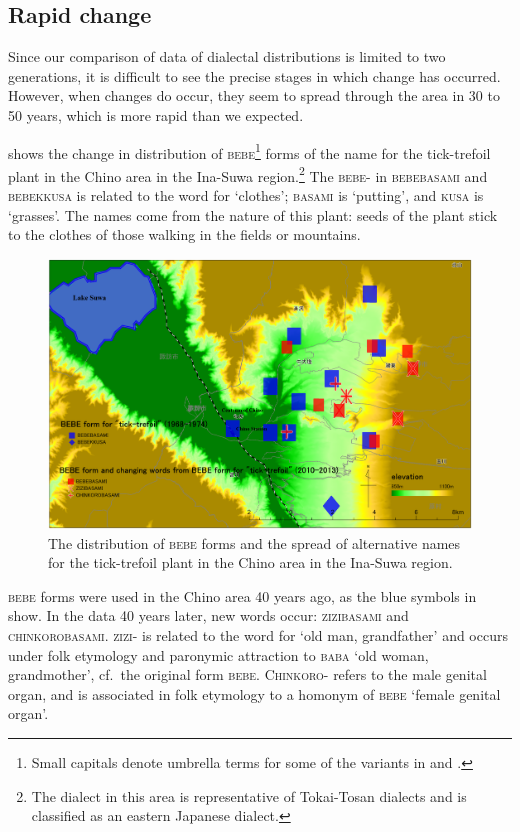 \documentclass[output=paper]{LSP/langsci}
\begin{document}
\subsection{Rapid change}
Since our comparison of  data of dialectal distributions is limited to two generations, it is difficult to see the precise stages in which change has occurred. However, when changes do occur, they seem to spread through the area in 30 to 50 years, which is more rapid than we expected.

 shows the change in distribution of \textsc{bebe}\footnote{ Small capitals denote umbrella terms for some of the variants in  and .} forms of the name for the tick-trefoil plant in the Chino area in the Ina-Suwa region.\footnote{ The dialect in this area is representative of Tokai-Tosan dialects and is classified as an eastern Japanese dialect.} The \textsc{bebe-} in \textsc{bebebasami} and \textsc{bebekkusa} is related to the word for `clothes'; \textsc{basami} is `putting', and \textsc{kusa} is `grasses'. The names come from the nature of this plant: seeds of the plant stick to the clothes of those walking in the fields or mountains.

\begin{figure}
\includegraphics[height=.4\textheight]{illustrations/onishi_fig5}
\caption{The distribution of \textsc{bebe} forms and the spread of alternative names for the tick-trefoil plant in the Chino area in the Ina-Suwa region.}
\label{fig:onishi:5}
\end{figure}


\largerpage
\textsc{bebe} forms were used in the Chino area 40 years ago, as the blue symbols in  show. In the data 40 years later, new words occur: \textsc{zizibasami} and \textsc{chinkorobasami}.  \textsc{zizi-} is related to the word for `old man, grandfather' and occurs under folk etymology and paronymic attraction to \textsc{baba} `old woman, grandmother', cf.\ the original form \textsc{bebe}. \textsc{Chinkoro-} refers to the male genital organ, and is associated in folk etymology to a homonym of \textsc{bebe} `female genital organ'.
\end{document}
